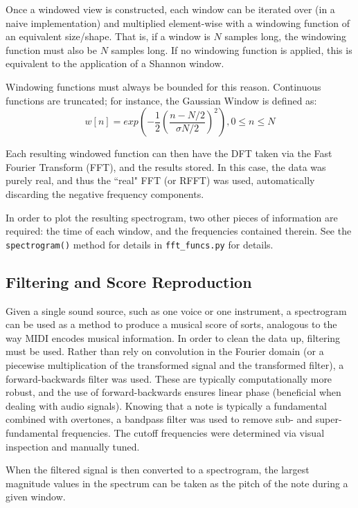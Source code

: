 \documentclass[journal]{IEEEtran}
\def\code#1{\texttt{#1}}
\begin{document}
Once a windowed view is constructed, each window can be iterated over (in a naive implementation) and multiplied element-wise with a windowing function of an equivalent size/shape. That is, if a window is
$N$ samples long, the windowing function must also be $N$ samples long. If no windowing function is applied, this is equivalent to the application of a Shannon window.

Windowing functions must always be bounded for this reason. Continuous functions are truncated; for instance, the Gaussian Window is defined as:
\begin{equation}
w[n]=exp(-\frac{1}{2}(\frac{n-N/2}{\sigma N/2})^2), 0 \leq n \leq N
\end{equation}

Each resulting windowed function can then have the DFT taken via the Fast Fourier Transform (FFT), and the results stored. In this case, the data was purely real, and thus the ``real" FFT (or RFFT) was used, automatically
discarding the negative frequency components.

In order to plot the resulting spectrogram, two other pieces of information are required: the time of each window, and the frequencies contained therein. See the \code{spectrogram()} method for details in \code{fft\_funcs.py} for details.

\subsection{Filtering and Score Reproduction}
Given a single sound source, such as one voice or one instrument, a spectrogram can be used as a method to produce a musical score of sorts,
analogous to the way MIDI encodes musical information. In order to clean the data up, filtering must be used. Rather than rely on convolution in the Fourier domain (or a piecewise multiplication
of the transformed signal and the transformed filter), a forward-backwards filter was used. These are typically computationally more robust, and the use of forward-backwards ensures linear phase
(beneficial when dealing with audio signals). Knowing that a note is typically a fundamental combined with overtones, a bandpass filter was used to remove sub- and super-fundamental frequencies. The
cutoff frequencies were determined via visual inspection and manually tuned.

When the filtered signal is then converted to a spectrogram, the largest magnitude values in the spectrum can be taken as the pitch of the note during a given window.
\end{document}
